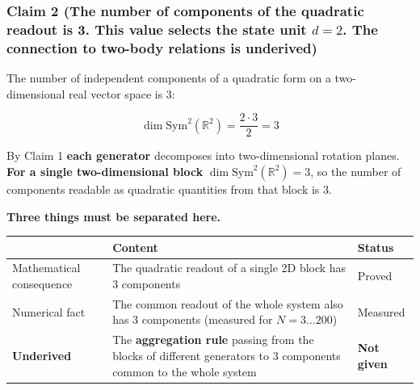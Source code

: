 \documentclass[
  10pt,
]{article}
\newcounter{none} %
\begin{document}
\subsubsection{\texorpdfstring{Claim 2 (The number of components of the
quadratic readout is 3. This value selects the state unit \(d=2\). The
connection to two-body relations is
underived)}{Claim 2 (The number of components of the quadratic readout is 3. This value selects the state unit d=2. The connection to two-body relations is underived)}}\label{claim-2-the-number-of-components-of-the-quadratic-readout-is-3.-this-value-selects-the-state-unit-d2.-the-connection-to-two-body-relations-is-underived}

The number of independent components of a quadratic form on a
two-dimensional real vector space is 3:

\[\dim\mathrm{Sym}^2(\mathbb{R}^2) = \frac{2\cdot3}{2} = 3\]

By Claim 1 \textbf{each generator} decomposes into two-dimensional
rotation planes. \textbf{For a single two-dimensional block}
\(\dim\mathrm{Sym}^2(\mathbb{R}^2) = 3\), so the number of components
readable as quadratic quantities from that block is 3.

\textbf{Three things must be separated here.}

{\def\LTcaptype{none} %
\begin{longtable}[]{@{}
  >{\raggedright\arraybackslash}p{}
  >{\raggedright\arraybackslash}p{}
  >{\raggedright\arraybackslash}p{}@{}}
\toprule\noalign{}
\begin{minipage}[b]{\linewidth}\raggedright
\end{minipage} & \begin{minipage}[b]{\linewidth}\raggedright
Content
\end{minipage} & \begin{minipage}[b]{\linewidth}\raggedright
Status
\end{minipage} \\
\midrule\noalign{}
\endhead
\bottomrule\noalign{}
\endlastfoot
Mathematical consequence & The quadratic readout of a single 2D block
has 3 components & Proved \\
Numerical fact & The common readout of the whole system also has 3
components (measured for \(N=3\dots200\)) & Measured \\
\textbf{Underived} & The \textbf{aggregation rule} passing from the
blocks of different generators to 3 components common to the whole
system & \textbf{Not given} \\
\end{longtable}
}
\end{document}
